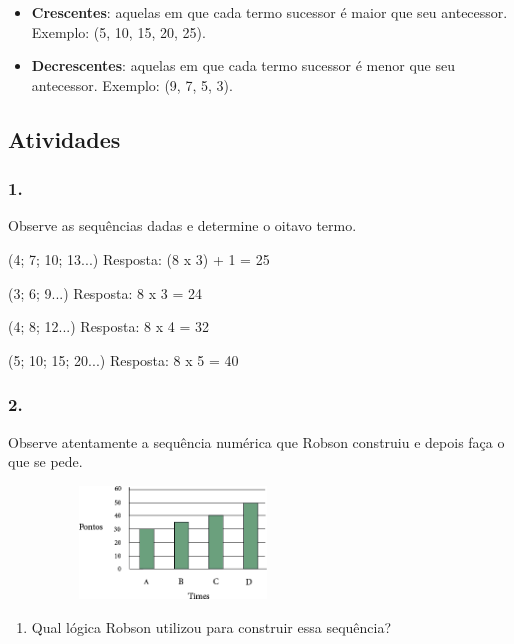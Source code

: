 \begin{enumerate}
\begin{escolha}
\begin{itemize}
\item
  \textbf{Crescentes}: aquelas em que cada termo sucessor é maior que seu
  antecessor. Exemplo: (5, 10, 15, 20, 25).
\item
  \textbf{Decrescentes}: aquelas em que cada termo sucessor é menor que
  seu antecessor. Exemplo: (9, 7, 5, 3).
\end{itemize}

\subsection{Atividades}\label{atividades-2}

\subsubsection{1.}\label{section-26}

Observe as sequências dadas e determine o oitavo termo.

\begin{escolha}
  \item (4; 7; 10; 13...)
Resposta: (8 x 3) + 1 = 25
  \item (3; 6; 9...)
Resposta: 8 x 3 = 24
  \item (4; 8; 12...)
Resposta: 8 x 4 = 32
  \item (5; 10; 15; 20...)
Resposta: 8 x 5 = 40
\end{escolha}

\subsubsection{2.}\label{section-27}

Observe atentamente a sequência numérica que Robson construiu e depois
faça o que se pede.

\includegraphics[width=3.44197in,height=1.18344in]{media/image43.png}

\begin{enumerate}
\def\labelenumi{\alph{enumi})}
\item
  Qual lógica Robson utilizou para construir essa sequência?
\end{enumerate}


\end{escolha}
\end{enumerate}

